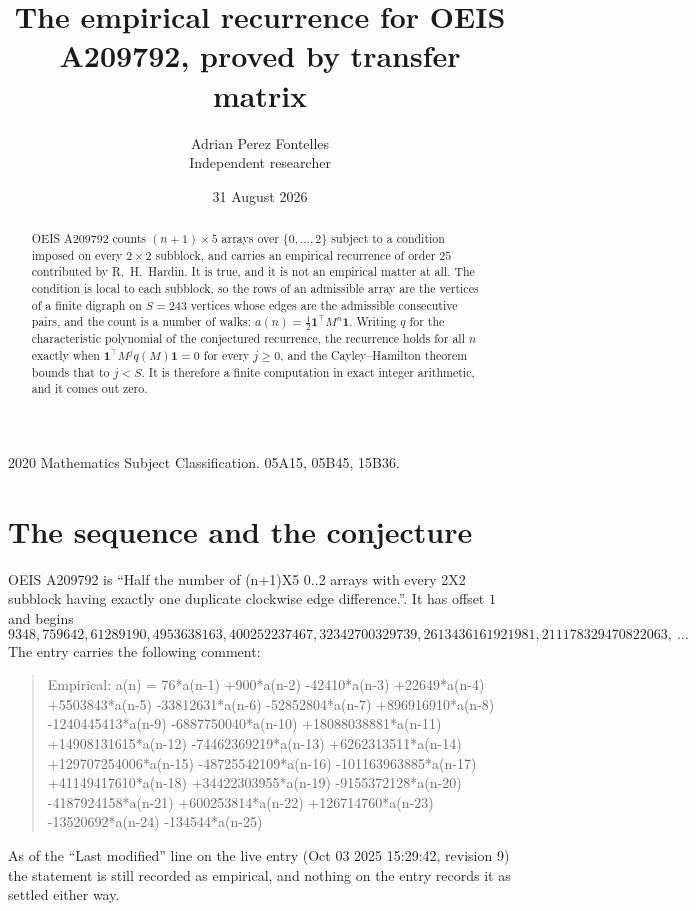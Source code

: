 \documentclass[11pt,a4paper]{article}
\title{The empirical recurrence for OEIS A209792, proved by transfer matrix}
\author{Adrian Perez Fontelles\\ \small Independent researcher}
\date{31 August 2026}
\theoremstyle{plain}
\theoremstyle{definition}
\begin{document}
\maketitle

\begin{abstract}
OEIS A209792 counts $(n+1)\times5$ arrays over $\{0,\dots,2\}$ subject to a condition imposed on
every $2\times2$ subblock, and carries an empirical recurrence of order $25$ contributed
by R.~H.~Hardin. It is true, and it is not an empirical matter at all. The condition is local
to each subblock, so the rows of an admissible array are the vertices of a finite digraph
on $S=243$ vertices whose edges are the admissible consecutive pairs, and the count is a
number of walks: $a(n)=\tfrac1{2}\mathbf{1}^{\!\top}M^{n}\mathbf{1}$. Writing $q$
for the characteristic polynomial of the conjectured recurrence, the recurrence holds for all
$n$ exactly when $\mathbf{1}^{\!\top}M^{j}q(M)\mathbf{1}=0$ for every $j\ge0$, and the
Cayley--Hamilton theorem bounds that to $j<S$. It is therefore a finite computation in exact
integer arithmetic, and it comes out zero.
\end{abstract}

\noindent\small 2020 Mathematics Subject Classification. 05A15, 05B45, 15B36.\normalsize

\section{The sequence and the conjecture}

OEIS A209792 is ``Half the number of (n+1)X5 0..2 arrays with every 2X2 subblock having exactly one duplicate clockwise edge difference.''. It has offset $1$ and begins
\[
9348, 759642, 61289190, 4953638163, 400252237467, 32342700329739, 2613436161921981, 211178329470822063,\ \dots
\]
The entry carries the following comment:
\begin{quote}\small
Empirical: a(n) = 76*a(n-1) +900*a(n-2) -42410*a(n-3) +22649*a(n-4) +5503843*a(n-5) -33812631*a(n-6) -52852804*a(n-7) +896916910*a(n-8) -1240445413*a(n-9) -6887750040*a(n-10) +18088038881*a(n-11) +14908131615*a(n-12) -74462369219*a(n-13) +6262313511*a(n-14) +129707254006*a(n-15) -48725542109*a(n-16) -101163963885*a(n-17) +41149417610*a(n-18) +34422303955*a(n-19) -9155372128*a(n-20) -4187924158*a(n-21) +600253814*a(n-22) +126714760*a(n-23) -13520692*a(n-24) -134544*a(n-25)
\end{quote}
As of the ``Last modified'' line on the live entry (Oct 03 2025 15:29:42, revision 9) the statement is
still recorded as empirical, and nothing on the entry records it as settled either way.
\end{document}
